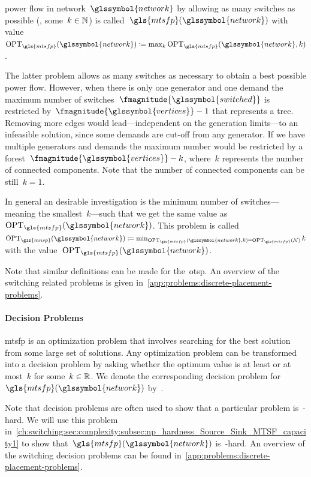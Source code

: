 power
flow in network~$\glssymbol{network}$ by allowing as many switches as possible
(\ie, some~$k\in\mathbb{N}$) is called~$
% 
  \gls{mtsfp}(\glssymbol{network})
% 
$ with value~$
% 
\opt_{\gls{mtsfp}}(\glssymbol{network})
\coloneqq
\max_{k}\opt_{\gls{mtsfp}}(\glssymbol{network},k)
% 
$.
% 
\begingroup
    
    \label{ch:switching:problems:MTSF_with_k_switches-Optimization_problem:2}
\endgroup
% 
The latter problem allows as many switches as necessary to obtain a best
possible power flow. However, when there is only one generator and one demand
the maximum number of switches~$\fmagnitude{\glssymbol{switched}}$ is restricted
by~$\fmagnitude{\glssymbol{vertices}}-1$ that represents a tree. Removing more
edges would lead---independent on the generation limits---to an infeasible
solution, since some demands are cut-off from any generator. If we have multiple
generators and demands the maximum number would be restricted by a
forest~$\fmagnitude{\glssymbol{vertices}}-k$, where~$k$ represents the number of
connected components. Note that the number of connected components can be
still~$k=1$.

In general an desirable investigation is the minimum number of
switches---meaning the smallest~$k$---such that we get the same value
as~$\opt_{\gls{mtsfp}}(\glssymbol{network})$. This problem is called~$
% 
\opt_{\gls{mnsp}}(\glssymbol{network})
\coloneqq
\min_{
  \opt_{\gls{mtsfp}}(\glssymbol{network},k)
  =
  \opt_{\gls{mtsfp}
}(\network)} k
% 
$ with the value~$\opt_{\gls{mtsfp}}(\glssymbol{network})$. 
% 
\begingroup
    
    \label{ch:switching:problems:MNS_under_MTSF-Optimization_problem}
\endgroup
% 
Note that similar definitions can be made for the~\gls{otsp}. An overview of the
switching related problems is given
in~\cref{app:problems:discrete-placement-problems}.
% 
\paragraph{Decision Problems}
% 
\gls{mtsfp} is an optimization problem that involves searching for the best
solution from some large set of solutions. Any optimization problem can be
transformed into a decision problem by asking whether the optimum value is at
least or at most~$k$ for some~$k\in\mathbb{R}$. We denote the corresponding decision
problem for~$\gls{mtsfp}(\glssymbol{network})$ by~\kmtsfp.
%
\begingroup
    
    \label{ch:switching:problems:MNS_under_MTSF-Decision_Problem}
\endgroup
% 
Note that decision problems are often used to show that a particular problem
is~\NP-hard. We will use this problem
in~\cref{ch:switching:sec:complexity:subsec:np_hardness_Source_Sink_MTSF_capacity1}
to show that~$\gls{mtsfp}(\glssymbol{network})$ is~\NP-hard. An overview of the
switching decision problems can be found
in~\cref{app:problems:discrete-placement-problems}.
% 
